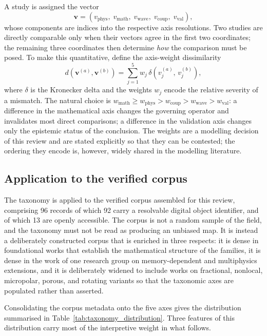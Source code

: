 A study is assigned the vector
\begin{equation}
\bm{v} = \left(v_{\text{phys}},\; v_{\text{math}},\; v_{\text{wave}},\; v_{\text{coup}},\; v_{\text{val}}\right),
\label{eq:14.1}
\end{equation}
whose components are indices into the respective axis resolutions. Two studies are directly comparable only when their vectors agree in the first two coordinates; the remaining three coordinates then determine \emph{how} the comparison must be posed. To make this quantitative, define the axis-weight dissimilarity
\begin{equation}
d(\bm{v}^{(a)},\bm{v}^{(b)}) = \sum_{j=1}^{5} w_j \,\delta\!\left(v^{(a)}_j,\, v^{(b)}_j\right),
\label{eq:14.2}
\end{equation}
where $\delta$ is the Kronecker delta and the weights $w_j$ encode the relative severity of a mismatch. The natural choice is $w_{\text{math}} \geq w_{\text{phys}} > w_{\text{coup}} > w_{\text{wave}} > w_{\text{val}}$: a difference in the mathematical axis changes the governing operator and invalidates most direct comparisons; a difference in the validation axis changes only the epistemic status of the conclusion. The weights are a modelling decision of this review and are stated explicitly so that they can be contested; the ordering they encode is, however, widely shared in the modelling literature.

\subsection{Application to the verified corpus}
\label{sec:14.3}

The taxonomy is applied to the verified corpus assembled for this review, comprising 96 records of which 92 carry a resolvable digital object identifier, and of which 13 are openly accessible. The corpus is not a random sample of the field, and the taxonomy must not be read as producing an unbiased map. It is instead a deliberately constructed corpus that is enriched in three respects: it is dense in foundational works that establish the mathematical structure of the families, it is dense in the work of one research group on memory-dependent and multiphysics extensions, and it is deliberately widened to include works on fractional, nonlocal, micropolar, porous, and rotating variants so that the taxonomic axes are populated rather than asserted.

Consolidating the corpus metadata onto the five axes gives the distribution summarised in Table~\ref{tab:taxonomy_distribution}. Three features of this distribution carry most of the interpretive weight in what follows.

